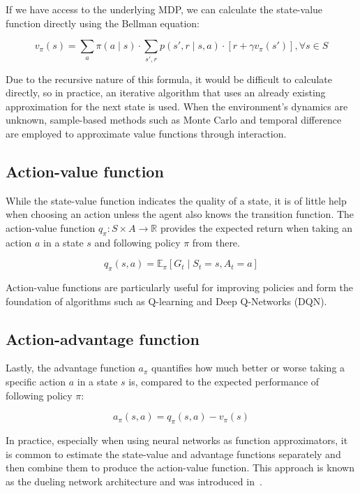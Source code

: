 \documentclass[
  digital,     %
  oneside,     %
  nosansbold,  %
  nocolorbold, %
  lof,         %
  lot,         %
]{fithesis4}
\begin{document}
If we have access to the underlying MDP, we can calculate the state-value function directly using the Bellman equation:

\begin{equation}
v_\pi(s) = \sum_a \pi(a\mid s) \cdot \sum_{s',r} p(s',r\mid s,a)\cdot[r+\gamma v_\pi(s')], \forall s \in S
\end{equation}

Due to the recursive nature of this formula, it would be difficult to calculate directly, so in practice, an iterative algorithm that uses an already existing approximation for the next state is used. When the environment's dynamics are unknown, sample-based methods such as Monte Carlo and temporal difference are employed to approximate value functions through interaction.

\subsection{Action-value function}

While the state-value function indicates the quality of a state, it is of little help when choosing an action unless the agent also knows the transition function. The action-value function $q_\pi\colon S \times A \to \mathbb{R}$ provides the expected return when taking an action $a$ in a state $s$ and following policy $\pi$ from there.

\begin{equation}
q_\pi(s,a) = \mathbb{E}_\pi [G_t\mid S_t=s,A_t=a]
\end{equation}

Action-value functions are particularly useful for improving policies and form the foundation of algorithms such as Q-learning and Deep Q-Networks (DQN).

\subsection{Action-advantage function}

Lastly, the advantage function $a_\pi$ quantifies how much better or worse taking a specific action $a$ in a state $s$ is, compared to the expected performance of following policy $\pi$:

\begin{equation}
a_\pi(s,a) = q_\pi(s,a)-v_\pi(s)
\end{equation}

In practice, especially when using neural networks as function approximators, it is common to estimate the state-value and advantage functions separately and then combine them to produce the action-value function. This approach is known as the dueling network architecture and was introduced in~\cite{dueling_arch}.
\end{document}
